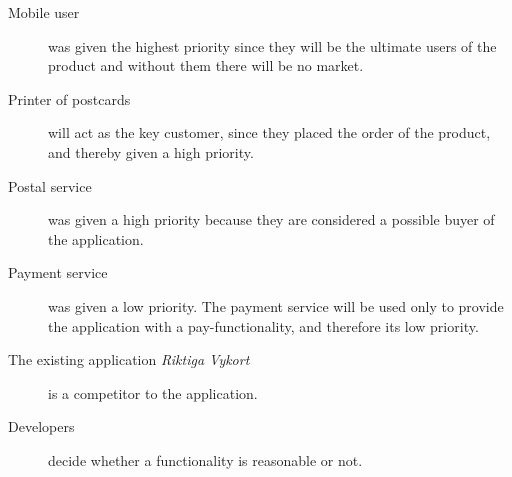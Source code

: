 \documentclass[10pt,a4paper]{article}
\begin{document}
\begin{description}
\item[Mobile user] was given the highest priority since they will be the ultimate users of the product and without them there will be no market.
\item[Printer of postcards] will act as the key customer, since they placed the order of the product, and thereby given a high priority. 
\item[Postal service] was given a high priority because they are considered a possible buyer of the application. 
\item[Payment service] was given a low priority. The payment service will be used only to provide the application with a pay-functionality, and therefore its low priority.
\item[The existing application \textit{Riktiga Vykort}]  is a competitor to the application. 
\item[Developers]  decide whether a functionality is reasonable or not.
\end{description}
\end{document}
